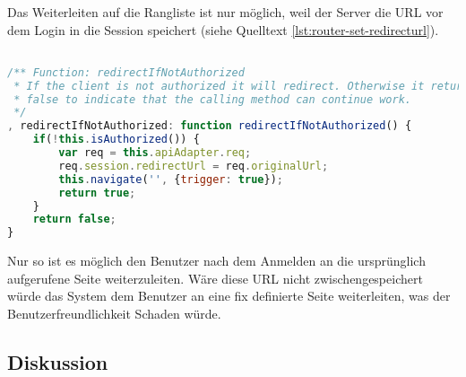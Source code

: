 Das Weiterleiten auf die Rangliste ist nur möglich, weil der Server die \gls{URL} vor dem Login in die Session speichert (siehe Quelltext \ref{lst:router-set-redirecturl}).

\begin{lstlisting}[language=JavaScript, caption=Router - Autorisationskontrolle \cite{roomiesRouter}, label=lst:router-set-redirecturl, firstnumber=225]

/** Function: redirectIfNotAuthorized
 * If the client is not authorized it will redirect. Otherwise it returns
 * false to indicate that the calling method can continue work.
 */
, redirectIfNotAuthorized: function redirectIfNotAuthorized() {
	if(!this.isAuthorized()) {
		var req = this.apiAdapter.req;
		req.session.redirectUrl = req.originalUrl;
		this.navigate('', {trigger: true});
		return true;
	}
	return false;
}
\end{lstlisting}

Nur so ist es möglich den Benutzer nach dem Anmelden an die ursprünglich aufgerufene Seite weiterzuleiten. Wäre diese \gls{URL} nicht zwischengespeichert würde das System dem Benutzer an eine fix definierte Seite weiterleiten, was der Benutzerfreundlichkeit Schaden würde.

\subsection*{Diskussion}
